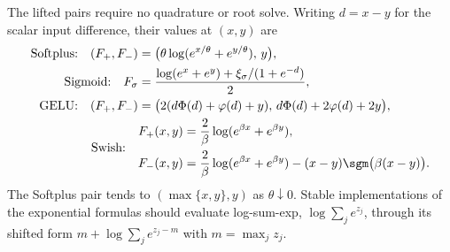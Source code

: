 The lifted pairs require no quadrature or root solve. Writing $d=x-y$ for the scalar input difference, their values at $(x,y)$ are
\begin{align}
    \text{Softplus:}\quad (F_+,F_-)&=\bigl(\theta\log(e^{x/\theta}+e^{y/\theta}),\,y\bigr),
    \label{eq:softplus_dc_closed}\\
    \text{Sigmoid:}\quad F_\sigma&=\frac{\log(e^x+e^y)+\xi_\sigma/(1+e^{-d})}{2},
    \label{eq:sigmoid_dc_closed}\\
    \text{GELU:}\quad (F_+,F_-)&=\bigl(2(d\Phi(d)+\varphi(d)+y),\,d\Phi(d)+2\varphi(d)+2y\bigr),
    \label{eq:gelu_dc_closed}\\
    \text{Swish:}\quad &\begin{aligned}
        F_+(x,y)&=\frac{2}{\beta}\log(e^{\beta x}+e^{\beta y}),\\
        F_-(x,y)&=\frac{2}{\beta}\log(e^{\beta x}+e^{\beta y})-(x-y)\sgm\bigl(\beta(x-y)\bigr).
    \end{aligned}
    \label{eq:swish_dc_closed}
\end{align}
The Softplus pair tends to $(\max\{x,y\},y)$ as $\theta\downarrow0$.
Stable implementations of the exponential formulas should evaluate log-sum-exp, $\log\sum_je^{z_j}$, through its shifted form $m+\log\sum_je^{z_j-m}$ with $m=\max_jz_j$.


